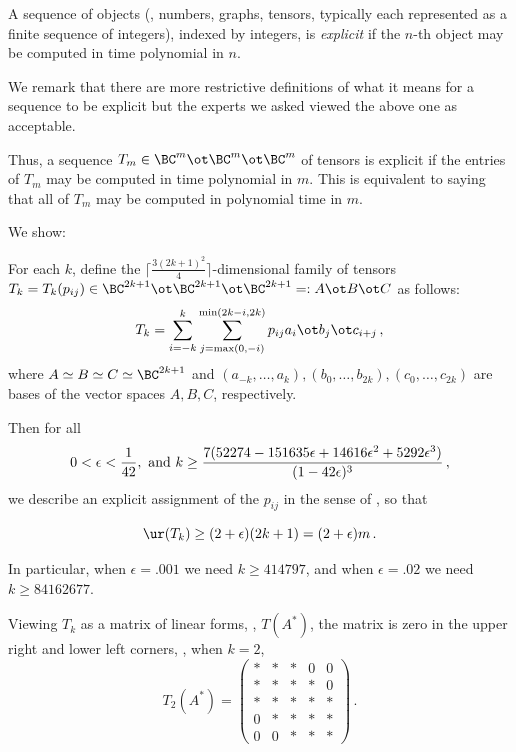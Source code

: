 \documentclass{toc}
\begin{document}
\begin{definition} \label{explicitdef}
 A sequence of objects (\eg, numbers, graphs, tensors, typically each represented as a finite sequence of integers), indexed by integers, %
 is \emph{explicit}  if the $n$-th object may be computed in time polynomial in $n$. 
\end{definition}

We remark that there are more restrictive definitions of
what it means for a sequence to be explicit but the experts we asked viewed the above one as acceptable.



Thus, a 
 sequence $T_m\in \BC^m\ot \BC^m\ot \BC^m$ of tensors is explicit if the 
 entries of $T_m$  may be computed in time polynomial   in $m$. This is equivalent to saying  that all of $T_m$ may be computed in polynomial time in $m$. 

  We show:

\begin{theorem} \label{mainthm}
For each  $k$,    define the $\lceil \frac{3(2k+1)^2}{4}\rceil$-dimensional
family of tensors $T_k=T_k(p_{ij})\in \BC^{2k+1}\ot\BC^{2k+1}\ot\BC^{2k+1}=: A\ot B\ot C$ %
as follows:
\begin{equation}\label{Tk}
T_k=\sum_{i=-k}^k \sum_{j=\max(0,-i)}^{\min(2k-i,2k)}p_{i j} a_i\ot b_j\ot c_{i+j}\,,
\end{equation}
where $A\simeq B\simeq C\simeq \BC^{2k+1}$ and $(a_{-k},\dots, a_k),(b_{0},\dots, b_{2k}),(c_{0},\dots, c_{2k})$
are %
bases of the vector spaces
$A,B,C$,
respectively.  %

Then for all 
$$0<\epsilon<\frac 1{42}, {\rm \  and   \ }  k\geq
\frac{7 (52274 - 151635 \epsilon + 14616 \epsilon^2 + 5292 \epsilon^3)}{(1 - 42 \epsilon)^3 }\,,
$$
we describe  an explicit assignment of the $p_{ij}$ 
in the sense of , so that

$$\ur(T_k)\geq (2+\epsilon)(2k+1)=(2+\epsilon)m\,.
$$

\end{theorem}

In particular,  when 
$\epsilon=.001$ we need $k\geq 414797$, %
%
 and when
 $\epsilon=.02$ we need
$k\geq 84162677$.

Viewing $T_k$ as a matrix of linear forms, \eg, $T(A^*)$, the matrix is zero in the upper right and lower left corners,
\eg, when $k=2$,
$$
T_2(A^*)=\begin{pmatrix}*&*&*&0&0\\  *&*&*&*&0\\ *&*&*&*&*\\  0&*&*&*&*\\   0&0&*&*&*\end{pmatrix}\,.
$$
\end{document}
